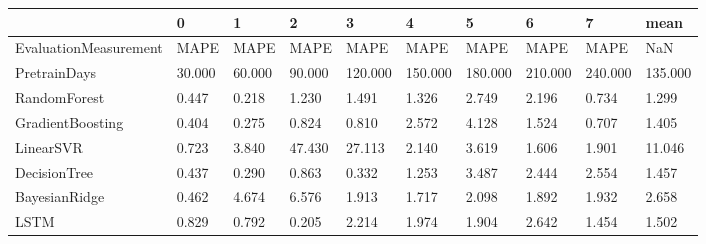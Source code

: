 \begin{tabular}{llllllllll}
\toprule
{} &      0 &      1 &      2 &       3 &       4 &       5 &       6 &       7 &    mean \\
\midrule
EvaluationMeasurement &   MAPE &   MAPE &   MAPE &    MAPE &    MAPE &    MAPE &    MAPE &    MAPE &     NaN \\
PretrainDays          & 30.000 & 60.000 & 90.000 & 120.000 & 150.000 & 180.000 & 210.000 & 240.000 & 135.000 \\
RandomForest          &  0.447 &  0.218 &  1.230 &   1.491 &   1.326 &   2.749 &   2.196 &   0.734 &   1.299 \\
GradientBoosting      &  0.404 &  0.275 &  0.824 &   0.810 &   2.572 &   4.128 &   1.524 &   0.707 &   1.405 \\
LinearSVR             &  0.723 &  3.840 & 47.430 &  27.113 &   2.140 &   3.619 &   1.606 &   1.901 &  11.046 \\
DecisionTree          &  0.437 &  0.290 &  0.863 &   0.332 &   1.253 &   3.487 &   2.444 &   2.554 &   1.457 \\
BayesianRidge         &  0.462 &  4.674 &  6.576 &   1.913 &   1.717 &   2.098 &   1.892 &   1.932 &   2.658 \\
LSTM                  &  0.829 &  0.792 &  0.205 &   2.214 &   1.974 &   1.904 &   2.642 &   1.454 &   1.502 \\
\bottomrule
\end{tabular}
